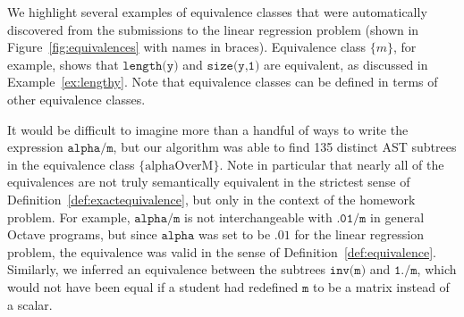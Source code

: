 \begin{example}
We highlight several examples of equivalence classes that were automatically discovered from the 
submissions to the linear regression problem (shown in Figure~\ref{fig:equivalences} with names in braces).  
Equivalence class $\{m\}$, for example, shows that $\texttt{length(y)}$ and $\texttt{size(y,1)}$ are equivalent, as discussed in Example~\ref{ex:lengthy}.
Note that equivalence classes can be defined in terms of other equivalence classes.

It would be difficult to imagine more than a handful of ways to write the expression $\texttt{alpha/m}$, 
but our algorithm was able to find 135 distinct AST subtrees in the equivalence class $\{\mbox{alphaOverM}\}$.
Note in particular that nearly all of the equivalences 
are not truly semantically equivalent in the strictest sense of Definition~\ref{def:exactequivalence}, but only
in the context of the homework problem.   For example, $\texttt{alpha/m}$ is not interchangeable
with $\texttt{.01/m}$ in general Octave programs, but since $\texttt{alpha}$ was set to be $.01$ for the linear
regression problem, the equivalence was valid in the sense of Definition~\ref{def:equivalence}.
Similarly, we inferred an equivalence between the subtrees $\texttt{inv(m)}$ and $\texttt{1./m}$, which would 
not have been equal if a student had redefined $\texttt{m}$ to be a matrix instead of a scalar.
\end{example}


